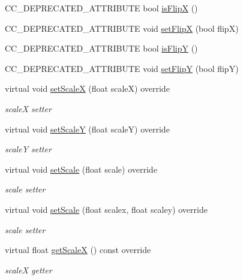 \begin{DoxyCompactItemize}
\item 
C\+C\+\_\+\+D\+E\+P\+R\+E\+C\+A\+T\+E\+D\+\_\+\+A\+T\+T\+R\+I\+B\+U\+TE bool \hyperlink{classui_1_1Widget_a21bb179e181b815212a32d4ab5b53f93}{is\+FlipX} ()
\item 
C\+C\+\_\+\+D\+E\+P\+R\+E\+C\+A\+T\+E\+D\+\_\+\+A\+T\+T\+R\+I\+B\+U\+TE void \hyperlink{classui_1_1Widget_a0bcb34000f6bfc5d11ee5ab9ba3da08d}{set\+FlipX} (bool flipX)
\item 
C\+C\+\_\+\+D\+E\+P\+R\+E\+C\+A\+T\+E\+D\+\_\+\+A\+T\+T\+R\+I\+B\+U\+TE bool \hyperlink{classui_1_1Widget_aff62decd50746935b04665e656678d7b}{is\+FlipY} ()
\item 
C\+C\+\_\+\+D\+E\+P\+R\+E\+C\+A\+T\+E\+D\+\_\+\+A\+T\+T\+R\+I\+B\+U\+TE void \hyperlink{classui_1_1Widget_a89ae260075d6faacc1b7d76734f8f4d4}{set\+FlipY} (bool flipY)
\item 
virtual void \hyperlink{classui_1_1Widget_a70186a0520486c8706b6326be6453fb4}{set\+ScaleX} (float scaleX) override
\begin{DoxyCompactList}\small\item\em scaleX setter \end{DoxyCompactList}\item 
virtual void \hyperlink{classui_1_1Widget_a8d68ee46f555dc23b8fcec84542eadcc}{set\+ScaleY} (float scaleY) override
\begin{DoxyCompactList}\small\item\em scaleY setter \end{DoxyCompactList}\item 
virtual void \hyperlink{classui_1_1Widget_aa614e1883fa58c0c7fefaa71d9055fd5}{set\+Scale} (float scale) override
\begin{DoxyCompactList}\small\item\em scale setter \end{DoxyCompactList}\item 
virtual void \hyperlink{classui_1_1Widget_a2ff6617263887b25fdb0ac06ac94f31a}{set\+Scale} (float scalex, float scaley) override
\begin{DoxyCompactList}\small\item\em scale setter \end{DoxyCompactList}\item 
virtual float \hyperlink{classui_1_1Widget_ad8e055be7f68c56594d97c71dff4f1ae}{get\+ScaleX} () const override
\begin{DoxyCompactList}\small\item\em scaleX getter \end{DoxyCompactList}\item 

\end{DoxyCompactItemize}
